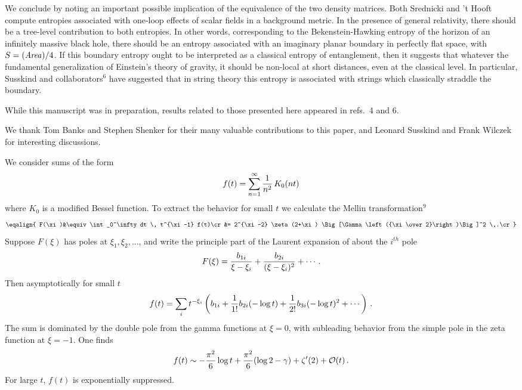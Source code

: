 We conclude by noting an important possible
implication of the equivalence of
the two density matrices.
Both Srednicki and 't Hooft compute entropies associated
with one-loop effects of scalar fields in a background metric.  In the
presence of general relativity, there should be a tree-level contribution
to both entropies.  In other words, corresponding to the Bekenstein-Hawking
entropy of the horizon of an infinitely massive black hole,
there should be an entropy associated
with an imaginary planar boundary in perfectly flat space, with $S=({\it Area})/4$.
If this boundary entropy ought to be interpreted as a classical
entropy of entanglement, then it suggests that whatever the
fundamental generalization of Einstein's theory of gravity, it should be
non-local at short distances, even at the classical level.
In particular, Susskind and collaborators$^6$ have suggested that
in string theory this entropy is associated  with strings which
classically straddle the boundary.


While this manuscript was in preparation, results related to those presented
here appeared in refs.~4 and 6.


\bigskip
\goodbreak
{}
\nobreak
\medskip
\nobreak
We thank Tom Banks and Stephen Shenker for their many valuable contributions
to this paper, and Leonard Susskind and Frank Wilczek for
interesting discussions.


\bigskip
\goodbreak
{}
\nobreak
\medskip
\nobreak

We consider sums of the form
$$f(t) = \sum_{n = 1}^\infty {1 \over n^2} \, K_0(nt)$$
where $K_0$ is a modified Bessel function.
To extract the behavior for small $t$ we calculate the Mellin
transformation$^9$
$$\eqalign{
F(\xi)&\equiv \int_0^\infty dt \, t^{\xi-1} f(t)\cr
            &= 2^{\xi-2} \zeta(2+\xi) \Big[\Gamma\left({\xi \over
2}\right)\Big]^2 \,.\cr}$$
Suppose $F(\xi)$ has poles at
$\xi_1,\xi_2,\ldots$, and write the principle part of the Laurent expansion
of about the $i^{th}$ pole
$$F(\xi) = {b_{1i} \over \xi - \xi_i} + {b_{2i} \over (\xi - \xi_i)^2}
             + \cdots \,. $$
Then asymptotically for small $t$
$$f(t) = \sum_i t^{- \xi_i} \left(b_{1i} + {1 \over 1!} b_{2i} (-\log t)
                  + {1 \over 2!} b_{3i} (-\log t)^2 + \cdots\right) \, .$$
The sum is dominated by the double pole
from the gamma functions at $\xi = 0$, with subleading behavior
from the simple pole in the zeta function at $\xi=-1$. One finds
$$f(t) \sim -{\pi^2 \over 6} \log t + {\pi^2 \over 6}(\log 2 - \gamma)
                   + \zeta'(2) + {\cal O}(t) \,.$$
For large $t$, $f(t)$ is exponentially suppressed.

